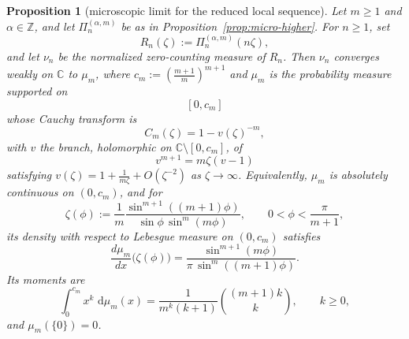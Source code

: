 \documentclass[reqno]{article}
\newtheorem{prop}[theorem]{Proposition}
\theoremstyle{definition}
\theoremstyle{remark}
\theoremstyle{plain}
\newcommand{\C}{\mathbb C}
\newcommand{\dd}{\,\mathrm d}
\begin{document}
\begin{prop}[microscopic limit for the reduced local sequence]\label{prop:micro-higher-limit}
Let $m\ge1$ and $\alpha\in\mathbb Z$, and let $\Pi_n^{(\alpha,m)}$ be as in Proposition~\ref{prop:micro-higher}. For $n\ge1$, set
$$R_n(\zeta):=\Pi_n^{(\alpha,m)}(n\zeta),$$
and let $\nu_n$ be the normalized zero-counting measure of $R_n$. Then $\nu_n$ converges weakly on $\C$ to $\mu_m$, where $c_m:=\left(\frac{m+1}{m}\right)^{m+1}$ and $\mu_m$ is the probability measure supported on
$$[0,c_m]$$
whose Cauchy transform is
$$C_m(\zeta)=1-v(\zeta)^{-m},$$
with $v$ the branch, holomorphic on $\C\setminus[0,c_m]$, of
$$v^{m+1}=m\zeta(v-1)$$
satisfying $v(\zeta)=1+\frac{1}{m\zeta}+O(\zeta^{-2})$ as $\zeta\to\infty$. Equivalently, $\mu_m$ is absolutely continuous on $(0,c_m)$, and for
$$\zeta(\phi):=\frac{1}{m}\frac{\sin^{m+1}((m+1)\phi)}{\sin\phi\,\sin^m(m\phi)},\qquad 0<\phi<\frac{\pi}{m+1},$$
its density with respect to Lebesgue measure on $(0,c_m)$ satisfies
$$\frac{d\mu_m}{dx}\bigl(\zeta(\phi)\bigr)=\frac{\sin^{m+1}(m\phi)}{\pi\,\sin^m((m+1)\phi)}.$$
Its moments are
$$\int_0^{c_m} x^k\,\dd\mu_m(x)=\frac{1}{m^k(k+1)}\binom{(m+1)k}{k},\qquad k\ge0,$$
and $\mu_m(\{0\})=0$.
\end{prop}
\end{document}
